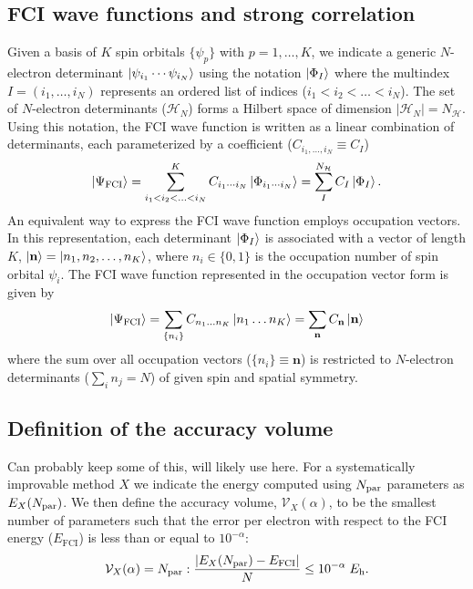 \documentclass[aip,jcp,amsmath,amssymb, reprint]{revtex4-1}
\newcommand*{\nfci}{N_\mathcal{H}}
\newcommand*{\ncomp}{\mathcal{V}_X}
\begin{document}
\subsection{FCI wave functions and strong correlation}
\label{sec:fci_wf}
Given a basis of $K$ spin orbitals $\{\psi_p\}$ with $p = 1,\ldots,K$, we indicate a generic $N$-electron determinant $\ket{\psi_{i_1}\cdots\psi_{i_N}}$ using the notation $\ket{\Phi_I}$ where the multindex $I = (i_1,\ldots,i_N)$ represents an ordered list of indices ($i_1 < i_2 < \ldots < i_N$).
The set of $N$-electron determinants ($\mathcal{H}_N$) forms a Hilbert space of dimension $|\mathcal{H}_N| = \nfci$.
Using this notation, the FCI wave function is written as a linear combination of determinants, each parameterized by a coefficient ($C_{i_1,\ldots,i_N} \equiv C_{I} $)
\begin{equation}
\ket{\Psi_{\text{FCI}}} = \sum_{i_1 < i_2 < \ldots < i_N}^{K} C_{i_1 \cdots i_N} \ket{\Phi_{i_1 \cdots i_N}}  = \sum_{I}^{\nfci} C_{I} \ket{\Phi_{I}} 
\label{eq:fci_def1}.
\end{equation}
An equivalent way to express the FCI wave function employs occupation vectors.
In this representation, each determinant $\ket{\Phi_I}$ is associated with a vector of length $K$, $\ket{\mathbf{n}} =\ket{n_1, n_2, \ldots, n_K}$, where $n_i \in \{0,1\}$ is the occupation number of spin orbital $\psi_i$.
The FCI wave function represented in the occupation vector form is given by
\begin{equation}
\ket{\Psi_{\text{FCI}}}  = \sum_{\{  n_{i}\}} C_{n_{1} \ldots n_{K}} \ket{n_{1} \ldots n_{K}}
= \sum_{\mathbf{n}} C_{\mathbf{n}} \ket{\mathbf{n}}
\end{equation}
where the sum over all occupation vectors ($\{  n_{i}\} \equiv \mathbf{n}$) is restricted to $N$-electron determinants ($\sum_i n_j = N$) of given spin and spatial symmetry.

\subsection{Definition of the accuracy volume}
Can probably keep some of this, will likely use here.
For a systematically improvable method $X$ we indicate the energy computed using $N_{\rm{par}}$  parameters as $E_X(N_{\rm{par}})$. We then define the accuracy volume, $\ncomp(\alpha)$, to be the smallest number of parameters such that the error per electron with respect to the FCI energy ($E_\mathrm{FCI}$) is less than or equal to $10^{-\alpha}$:
\begin{equation}
\label{eq:Vx}
\ncomp(\alpha) = N_{\rm{par}} : \frac{ |E_X(N_{\rm{par}}) - E_\mathrm{FCI}|}{N} \leq  10^{-\alpha}  \; E_\mathrm{h}.
\end{equation}
\end{document}
